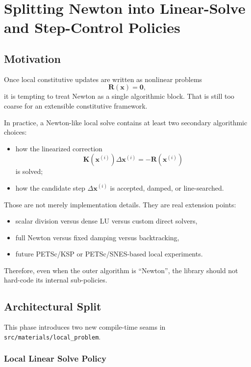\chapter{Splitting Newton into Linear-Solve and Step-Control Policies}

\section{Motivation}

Once local constitutive updates are written as nonlinear problems
\[
  \mathbf{R}(\mathbf{x}) = \mathbf{0},
\]
it is tempting to treat Newton as a single algorithmic block.  That is still
too coarse for an extensible constitutive framework.

In practice, a Newton-like local solve contains at least two secondary
algorithmic choices:
\begin{itemize}
  \item how the linearized correction
        \[
          \mathbf{K}(\mathbf{x}^{(i)}) \Delta \mathbf{x}^{(i)}
          = -\mathbf{R}(\mathbf{x}^{(i)})
        \]
        is solved;
  \item how the candidate step $\Delta\mathbf{x}^{(i)}$ is accepted, damped,
        or line-searched.
\end{itemize}

Those are not merely implementation details.  They are real extension points:
\begin{itemize}
  \item scalar division versus dense LU versus custom direct solvers,
  \item full Newton versus fixed damping versus backtracking,
  \item future PETSc/KSP or PETSc/SNES-based local experiments.
\end{itemize}

Therefore, even when the outer algorithm is ``Newton'', the library should not
hard-code its internal sub-policies.

\section{Architectural Split}

This phase introduces two new compile-time seams in
\texttt{src/materials/local\_problem}.

\subsection{Local Linear Solve Policy}

